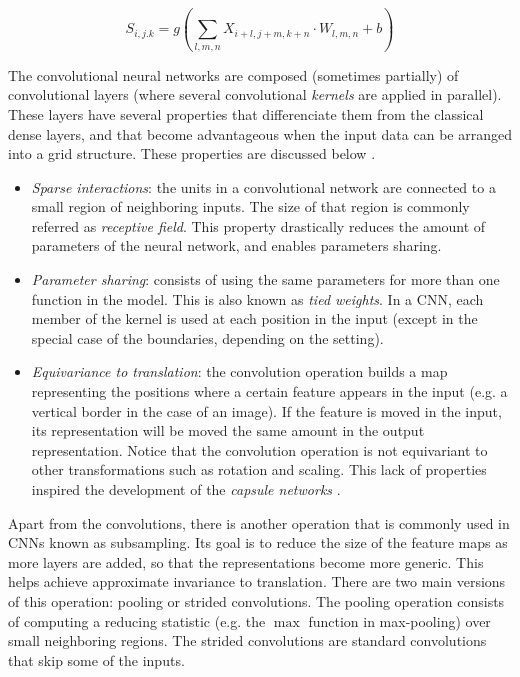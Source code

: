 \begin{equation}
	\label{eq:cnnformula}
	S_{i,j.k} = g\left(\sum_{l,m,n}{X_{i+l, j+m, k+n} \cdot W_{l,m,n} + b}\right)
\end{equation}

The convolutional neural networks are composed (sometimes partially) of convolutional layers (where several convolutional \textit{kernels} are applied in parallel). These layers have several properties that differenciate them from the classical dense layers, and that become advantageous when the input data can be arranged into a grid structure. These properties are discussed below \autocite{Goodfellow2016}.


\begin{itemize}
	\item \textit{Sparse interactions}: the units in a convolutional network are connected to a small region of neighboring inputs. The size of that region is commonly referred as \textit{receptive field}. This property drastically reduces the amount of parameters of the neural network, and enables parameters sharing.
	\item \textit{Parameter sharing}: consists of using the same parameters for more than one function in the model. This is also known as \textit{tied weights}. In a CNN, each member of the kernel is used at each position in the input (except in the special case of the boundaries, depending on the setting).
	\item \textit{Equivariance to translation}: the convolution operation builds a map representing the positions where a certain feature appears in the input (e.g. a vertical border in the case of an image). If the feature is moved in the input, its representation will be moved the same amount in the output representation. Notice that the convolution operation is not equivariant to other transformations such as rotation and scaling. This lack of properties inspired the development of the \textit{capsule networks} \autocite{sabour2017}.
\end{itemize}

Apart from the convolutions, there is another operation that is commonly used in CNNs known as subsampling. Its goal is to reduce the size of the feature maps as more layers are added, so that the representations become more generic. This helps achieve approximate invariance to translation. There are two main versions of this operation: pooling or strided convolutions. The pooling operation \autocite{Goodfellow2016} consists of computing a reducing statistic (e.g. the $\max$ function in max-pooling) over small neighboring regions. The strided convolutions \autocite{riadh2020} are standard convolutions that skip some of the inputs.

